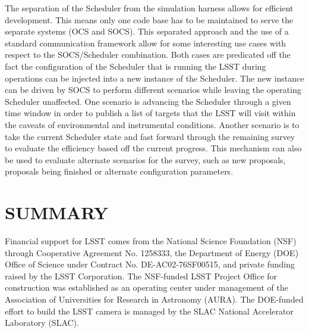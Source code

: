 \documentclass[]{spie}  %
\begin{document}
The separation of the Scheduler from the simulation harness allows for efficient development. This means only one code base has to be maintained to serve the separate systems (OCS and SOCS). This separated approach and the use of a standard communication framework allow for some interesting use cases with respect to the SOCS/Scheduler combination. Both cases are predicated off the fact the configuration of the Scheduler that is running the LSST during operations can be injected into a new instance of the Scheduler. The new instance can be driven by SOCS to perform different scenarios while leaving the operating Scheduler unaffected. One scenario is advancing the Scheduler through a given time window in order to publish a list of targets that the LSST will visit within the caveats of environmental and instrumental conditions. Another scenario is to take the current Scheduler state and fast forward through the remaining survey to evaluate the efficiency based off the current progress. This mechanism can also be used to evaluate alternate scenarios for the survey, such as new proposals, proposals being finished or alternate configuration parameters.

\section{SUMMARY}

\acknowledgments %

Financial support for LSST comes from the National Science Foundation (NSF) through Cooperative Agreement No. 1258333, the Department of Energy (DOE) Office of Science under Contract No. DE-AC02-76SF00515, and private funding raised by the LSST Corporation. The NSF-funded LSST Project Office for construction was established as an operating center under management of the Association of Universities for Research in Astronomy (AURA).  The DOE-funded effort to build the LSST camera is managed by the SLAC National Accelerator Laboratory (SLAC).    

\end{document}
